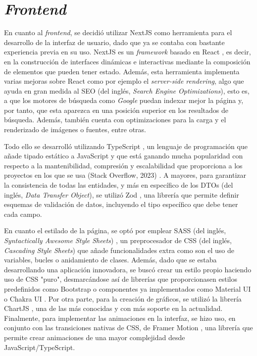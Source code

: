 \section{\textit{Frontend}}
\label{sec:herramientas_frontend}

En cuanto al \textit{frontend}, se decidió utilizar NextJS \cite{nextjs} como herramienta para el desarrollo de la interfaz de usuario, dado que ya
se contaba con bastante experiencia previa en su uso. NextJS es un \textit{framework} basado en React \cite{react}, es decir, en la construcción de interfaces dinámicas e interactivas mediante la composición
de elementos que pueden tener estado. Además, esta herramienta implementa varias mejoras sobre React como por ejemplo el \textit{server-side rendering}, algo que ayuda en gran medida
al SEO (del inglés, \textit{Search Engine Optimizations}), esto es, a que los motores de búsqueda como \textit{Google} puedan indexar mejor la página y, por tanto, que esta aparezca en una posición superior en los resultados de búsqueda.
Además, también cuenta con optimizaciones para la carga y el renderizado de imágenes o fuentes, entre otras.

\bigskip
Todo ello se desarrolló utilizando TypeScript \cite{typescript}, un lenguaje de programación que añade tipado estático a JavaScript
y que está ganando mucha popularidad con respecto a la mantenibilidad, compresión y escalabilidad que proporciona a los proyectos en los que se usa (Stack Overflow, 2023) \cite{stackoverflow2023}.
A mayores, para garantizar la consistencia de todas las entidades, y más en específico de los DTOs (del inglés, \textit{Data Transfer Object}), se utilizó Zod \cite{zod}, una librería que permite
definir esquemas de validación de datos, incluyendo el tipo específico que debe tener cada campo.

\bigskip
En cuanto el estilado de la página, se optó por emplear SASS (del inglés, \textit{Syntactically Awesome Style Sheets}) \cite{sass}, un preprocesador de CSS (del inglés, \textit{Cascading Style Sheets}) que añade
funcionalidades extra como son el uso de variables, bucles o anidamiento de clases. Además, dado que se estaba desarrollando
una aplicación innovadora, se buscó crear un estilo propio haciendo uso de CSS "puro", desmarcándose así de librerías que proporcionasen estilos predefinidos como Bootstrap \cite{bootstrap} o componentes ya implementados
como Material UI \cite{materialui} o Chakra UI \cite{chakraui}. Por otra parte, para la creación de gráficos, se utilizó la librería ChartJS \cite{chartjs}, una de las más conocidas
y con más soporte en la actualidad. Finalmente, para implementar las animaciones en la interfaz, se hizo uso, en conjunto con las transiciones nativas
de CSS, de Framer Motion \cite{framermotion}, una librería que permite crear animaciones de una mayor complejidad desde JavaScript/TypeScript.

